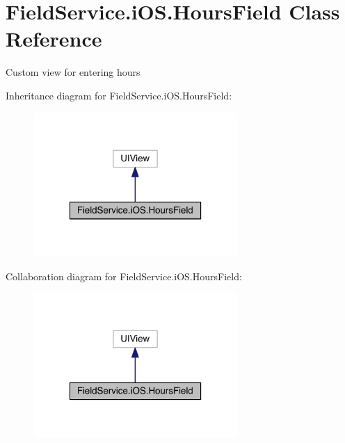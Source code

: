 \hypertarget{class_field_service_1_1i_o_s_1_1_hours_field}{\section{Field\+Service.\+i\+O\+S.\+Hours\+Field Class Reference}
\label{class_field_service_1_1i_o_s_1_1_hours_field}
}


Custom view for entering hours  




Inheritance diagram for Field\+Service.\+i\+O\+S.\+Hours\+Field\+:
\nopagebreak
\begin{figure}[H]
\begin{center}
\leavevmode
\includegraphics[width=220pt]{class_field_service_1_1i_o_s_1_1_hours_field__inherit__graph}
\end{center}
\end{figure}


Collaboration diagram for Field\+Service.\+i\+O\+S.\+Hours\+Field\+:
\nopagebreak
\begin{figure}[H]
\begin{center}
\leavevmode
\includegraphics[width=220pt]{class_field_service_1_1i_o_s_1_1_hours_field__coll__graph}
\end{center}
\end{figure}
